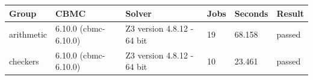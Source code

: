 \begin{tabular}{llllll}
\hline
Group & CBMC & Solver & Jobs & Seconds & Result \\
\hline
arithmetic & 6.10.0 (cbmc-6.10.0) & Z3 version 4.8.12 - 64 bit & 19 & 68.158 & passed \\
checkers & 6.10.0 (cbmc-6.10.0) & Z3 version 4.8.12 - 64 bit & 10 & 23.461 & passed \\
\hline
\end{tabular}
